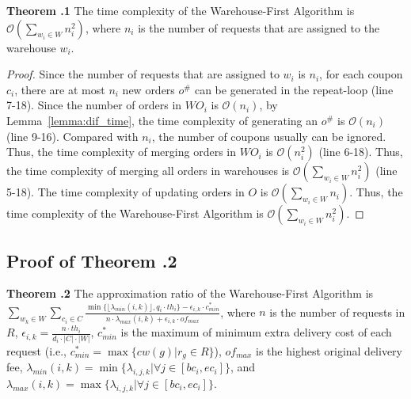\noindent\textbf{Theorem \uppercase\expandafter{}.1}
The time complexity of the Warehouse-First Algorithm is $\mathcal{O}(\sum\limits_{w_i \in W} n_i^2)$, where $n_i$ is the number of requests that are assigned to the warehouse $w_i$.

\begin{proof}
	Since the number of requests that are assigned to $w_i$ is $n_i$, for each coupon $c_i$, there are at most $n_i$ new orders $o^\#$ can be generated in the repeat-loop (line 7-18). Since the number of orders in $WO_i$ is $\mathcal{O}(n_i)$, by Lemma~\ref{lemma:dif_time}, the time complexity of generating an $o^\#$ is $\mathcal{O}(n_i)$ (line 9-16). Compared with $n_i$, the number of coupons usually can be ignored. Thus, the time complexity of merging orders in $WO_i$ is $\mathcal{O}(n_i^2)$ (line 6-18). Thus, the time complexity of merging all orders in warehouses is $\mathcal{O}(\sum\limits_{w_i \in W} n_i^2)$ (line 5-18). The time complexity of updating orders in $O$ is $\mathcal{O}(\sum\limits_{w_i \in W} n_i)$. Thus, the time complexity of the Warehouse-First Algorithm is $\mathcal{O}(\sum\limits_{w_i \in W} n_i^2)$.
\end{proof}

\subsection{Proof of Theorem \uppercase\expandafter{}.2}

\noindent\textbf{Theorem \uppercase\expandafter{}.2}
The approximation ratio of the Warehouse-First Algorithm is $\sum\limits_{w_k \in W}\sum\limits_{c_i \in C}\frac{ \min \{\lfloor \lambda_{min}(i, k) \rfloor, q_i \cdot th_i\} - \epsilon_{i, k} \cdot c^*_{min}}{n \cdot \lambda_{max}(i, k) + \epsilon_{i, k} \cdot of_{max}}$, where $n$ is the number of requests in $R$, $\epsilon_{i, k} = \frac{n \cdot th_i}{d_i \cdot |C| \cdot |W|}$, $c^*_{min}$ is the maximum of minimum extra delivery cost of each request (i.e., $c^*_{min} = \max \{cw(g)|r_g \in R\}$), $of_{max}$ is the highest original delivery fee, $\lambda_{min}(i, k) = \min\{\lambda_{i, j, k}| \forall j \in [bc_i, ec_i]\}$, and $\lambda_{max}(i, k) = \max\{\lambda_{i, j, k}|\forall j \in [bc_i, ec_i]\}$.

